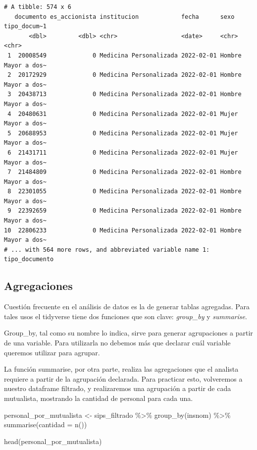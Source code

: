 \documentclass[
  letterpaper,
  DIV=11,
  numbers=noendperiod]{scrreprt}
\newenvironment{Shaded}{\begin{snugshade}}{\end{snugshade}}
\newcommand{\AttributeTok}[1]{\textcolor[rgb]{0.40,0.45,0.13}{#1}}
\newcommand{\FunctionTok}[1]{\textcolor[rgb]{0.28,0.35,0.67}{#1}}
\newcommand{\NormalTok}[1]{\textcolor[rgb]{0.00,0.23,0.31}{#1}}
\newcommand{\OtherTok}[1]{\textcolor[rgb]{0.00,0.23,0.31}{#1}}
\newcommand{\SpecialCharTok}[1]{\textcolor[rgb]{0.37,0.37,0.37}{#1}}
\begin{document}
\begin{verbatim}
# A tibble: 574 x 6
   documento es_accionista institucion            fecha      sexo   tipo_docum~1
       <dbl>         <dbl> <chr>                  <date>     <chr>  <chr>       
 1  20008549             0 Medicina Personalizada 2022-02-01 Hombre Mayor a dos~
 2  20172929             0 Medicina Personalizada 2022-02-01 Hombre Mayor a dos~
 3  20438713             0 Medicina Personalizada 2022-02-01 Hombre Mayor a dos~
 4  20480631             0 Medicina Personalizada 2022-02-01 Mujer  Mayor a dos~
 5  20688953             0 Medicina Personalizada 2022-02-01 Mujer  Mayor a dos~
 6  21431711             0 Medicina Personalizada 2022-02-01 Mujer  Mayor a dos~
 7  21484809             0 Medicina Personalizada 2022-02-01 Hombre Mayor a dos~
 8  22301055             0 Medicina Personalizada 2022-02-01 Hombre Mayor a dos~
 9  22392659             0 Medicina Personalizada 2022-02-01 Hombre Mayor a dos~
10  22806233             0 Medicina Personalizada 2022-02-01 Hombre Mayor a dos~
# ... with 564 more rows, and abbreviated variable name 1: tipo_documento
\end{verbatim}

\hypertarget{agregaciones}{%
\subsection{Agregaciones}\label{agregaciones}}

Cuestión frecuente en el análisis de datos es la de generar tablas
agregadas. Para tales usos el tidyverse tiene dos funciones que son
clave: \emph{group\_by} y \emph{summarise}.

Group\_by, tal como su nombre lo indica, sirve para generar agrupaciones
a partir de una variable. Para utilizarla no debemos más que declarar
cuál variable queremos utilizar para agrupar.

La función summarise, por otra parte, realiza las agregaciones que el
analista requiere a partir de la agrupación declarada. Para practicar
esto, volveremos a nuestro dataframe filtrado, y realizaremos una
agrupación a partir de cada mutualista, mostrando la cantidad de
personal para cada una.

\begin{Shaded}
\begin{Highlighting}[]
\NormalTok{personal\_por\_mutualista }\OtherTok{\textless{}{-}}\NormalTok{ sips\_filtrado }\SpecialCharTok{\%\textgreater{}\%} 
  \FunctionTok{group\_by}\NormalTok{(insnom) }\SpecialCharTok{\%\textgreater{}\%} 
  \FunctionTok{summarise}\NormalTok{(}\AttributeTok{cantidad =} \FunctionTok{n}\NormalTok{())}

\FunctionTok{head}\NormalTok{(personal\_por\_mutualista)}
\end{Highlighting}
\end{Shaded}
\end{document}
